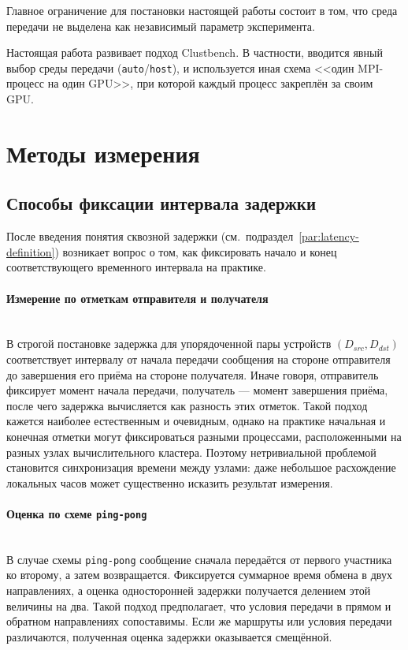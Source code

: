 \documentclass[a4paper,14pt]{extarticle}
\begin{document}
Главное ограничение для постановки настоящей работы состоит в том, что среда передачи не выделена как независимый параметр эксперимента.

Настоящая работа развивает подход Clustbench. В частности, вводится явный выбор среды передачи (\texttt{auto}/\texttt{host}), и используется иная схема <<один MPI-процесс на один GPU>>, при которой каждый процесс закреплён за своим GPU.

\newpage
\section{Методы измерения}
\label{sec:measurement-methodology}

\subsection{Способы фиксации интервала задержки}
\label{sec:latency-measurement-approaches}

После введения понятия сквозной задержки (см.~подраздел~\ref{par:latency-definition}) возникает вопрос о том, как фиксировать начало и конец соответствующего временного интервала на практике.

\paragraph{Измерение по отметкам отправителя и получателя}\mbox{}\\
\indent  В строгой постановке задержка для упорядоченной пары устройств $(D_{src}, D_{dst})$ соответствует интервалу от начала передачи сообщения на стороне отправителя до завершения его приёма на стороне получателя. Иначе говоря, отправитель фиксирует момент начала передачи, получатель --- момент завершения приёма, после чего задержка вычисляется как разность этих отметок. Такой подход кажется наиболее естественным и очевидным, однако на практике начальная и конечная отметки могут фиксироваться разными процессами, расположенными на разных узлах вычислительного кластера. Поэтому нетривиальной проблемой становится синхронизация времени между узлами: даже небольшое расхождение локальных часов может существенно исказить результат измерения.

\paragraph{Оценка по схеме \texttt{ping-pong}}\mbox{}\\
\indent В случае схемы \texttt{ping-pong} сообщение сначала передаётся от первого участника ко второму, а затем возвращается. Фиксируется суммарное время обмена в двух направлениях, а оценка односторонней задержки получается делением этой величины на два. Такой подход предполагает, что условия передачи в прямом и обратном направлениях сопоставимы. Если же маршруты или условия передачи различаются, полученная оценка задержки оказывается смещённой.
\end{document}
